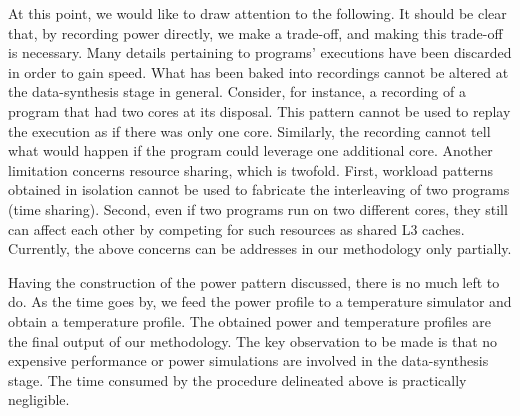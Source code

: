 At this point, we would like to draw attention to the following. It should be
clear that, by recording power directly, we make a trade-off, and making this
trade-off is necessary. Many details pertaining to programs' executions have
been discarded in order to gain speed. What has been baked into recordings
cannot be altered at the data-synthesis stage in general. Consider, for
instance, a recording of a program that had two cores at its disposal. This
pattern cannot be used to replay the execution as if there was only one core.
Similarly, the recording cannot tell what would happen if the program could
leverage one additional core. Another limitation concerns resource sharing,
which is twofold. First, workload patterns obtained in isolation cannot be used
to fabricate the interleaving of two programs (time sharing). Second, even if
two programs run on two different cores, they still can affect each other by
competing for such resources as shared L3 caches. Currently, the above concerns
can be addresses in our methodology only partially.

Having the construction of the power pattern discussed, there is no much left to
do. As the time goes by, we feed the power profile to a temperature simulator
and obtain a temperature profile. The obtained power and temperature profiles
are the final output of our methodology. The key observation to be made is that
no expensive performance or power simulations are involved in the data-synthesis
stage. The time consumed by the procedure delineated above is practically
negligible.
